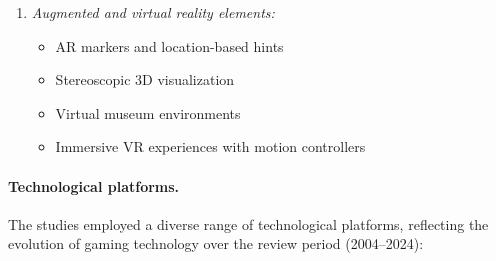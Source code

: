 \documentclass[a4paper,fleqn]{cas-sc}
\begin{document}
\begin{enumerate}[noitemsep]
	\item 
\textit{Augmented and virtual reality elements:}
\begin{itemize}[noitemsep]
 \item AR markers and location-based hints \citep{32Cheng20241718, 40Kuran2018, 49Huizenga2007127, 54Gibson2007, 69Wong2017150}
 \item Stereoscopic 3D visualization \citep{25Repantis2011502} 
 \item Virtual museum environments \citep{10Huaman2019220, 44Shiue2016, 48Moketar2021, 58Shih2015173, 73Wolfartsberger2011160, 77Ramansyah2021}
 \item Immersive VR experiences with motion controllers \citep{5kazanidis2018alpha, 10Huaman2019220}
\end{itemize}
\end{enumerate}


\paragraph{Technological platforms.}

The studies employed a diverse range of technological platforms, reflecting the evolution of gaming technology over the review period (2004--2024):
\end{document}
